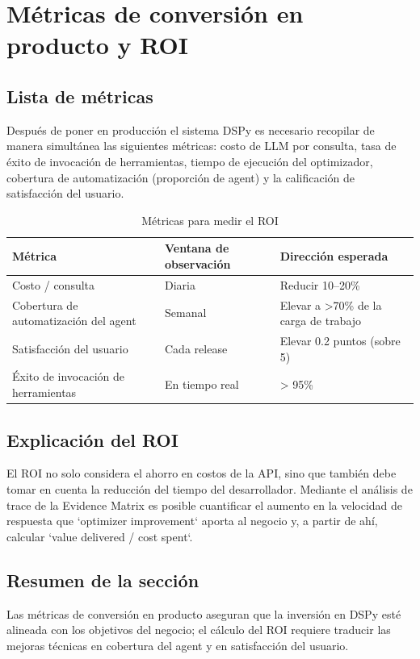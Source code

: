 \section{Métricas de conversión en producto y ROI}

\subsection{Lista de métricas}

Después de poner en producción el sistema DSPy es necesario recopilar de manera simultánea las siguientes métricas: costo de LLM por consulta, tasa de éxito de invocación de herramientas, tiempo de ejecución del optimizador, cobertura de automatización (proporción de agent) y la calificación de satisfacción del usuario.

\begin{table}[H]
\centering
\caption{Métricas para medir el ROI}
\begin{tabular}{p{}p{}p{}}
\toprule
Métrica & Ventana de observación & Dirección esperada \\
\midrule
Costo / consulta & Diaria & Reducir 10--20\% \\
Cobertura de automatización del agent & Semanal & Elevar a >70\% de la carga de trabajo \\
Satisfacción del usuario & Cada release & Elevar 0.2 puntos (sobre 5) \\
Éxito de invocación de herramientas & En tiempo real & > 95\% \\
\bottomrule
\end{tabular}
\end{table}

\subsection{Explicación del ROI}

El ROI no solo considera el ahorro en costos de la API, sino que también debe tomar en cuenta la reducción del tiempo del desarrollador. Mediante el análisis de trace de la Evidence Matrix es posible cuantificar el aumento en la velocidad de respuesta que `optimizer improvement` aporta al negocio y, a partir de ahí, calcular `value delivered / cost spent`.

\subsection{Resumen de la sección}

Las métricas de conversión en producto aseguran que la inversión en DSPy esté alineada con los objetivos del negocio; el cálculo del ROI requiere traducir las mejoras técnicas en cobertura del agent y en satisfacción del usuario.
